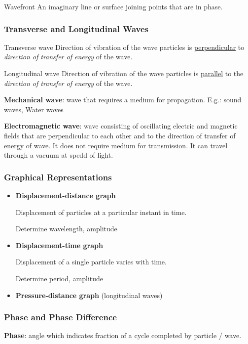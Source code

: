 \begin{defn}{Wavefront}{}
An imaginary line or surface joining points that are in phase.
\end{defn}

\subsubsection{Transverse and Longitudinal Waves}
\begin{defn}{Transverse wave}{}
Direction of vibration of the wave particles is \underline{perpendicular} to \emph{direction of transfer of energy} of the wave.
\end{defn}

\begin{defn}{Longitudinal wave}{}
Direction of vibration of the wave particles is \underline{parallel} to the \emph{direction of transfer of energy} of the wave.
\end{defn}

\textbf{Mechanical wave}: wave that requires a medium for propagation.
E.g.: sound waves, Water waves

\textbf{Electromagnetic wave}: wave consisting of oscillating electric and magnetic fields that are perpendicular to each other and to the direction of transfer of energy of wave. It does not require medium for transmission. It can travel through a vacuum at spedd of light.

\subsubsection{Graphical Representations}
\begin{itemize}
\item \textbf{Displacement-distance graph}

Displacement of particles at a particular instant in time.

Determine wavelength, amplitude

\item \textbf{Displacement-time graph}

Displacement of a single particle varies with time.

Determine period, amplitude

\item \textbf{Pressure-distance graph} (longitudinal waves)
\end{itemize}

\subsubsection{Phase and Phase Difference}
\textbf{Phase}: angle which indicates fraction of a cycle completed by particle / wave.

